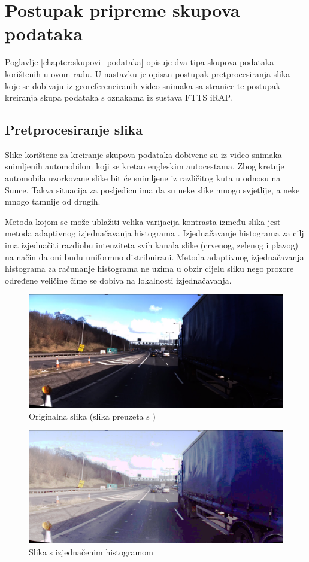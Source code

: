\documentclass[times, utf8, diplomski, numeric]{fer}
\begin{document}
\section{Postupak pripreme skupova podataka}
Poglavlje \ref{chapter:skupovi_podataka} opisuje dva tipa skupova podataka korištenih u ovom radu.
U nastavku je opisan postupak pretprocesiranja slika koje se dobivaju iz georeferenciranih video snimaka sa stranice \citep{url:ftts_irap} te postupak kreiranja skupa podataka s oznakama iz sustava FTTS iRAP.

\subsection{Pretprocesiranje slika}
Slike korištene za kreiranje skupova podataka dobivene su iz video snimaka snimljenih automobilom koji se kretao engleskim autocestama.
Zbog kretnje automobila uzorkovane slike bit će snimljene iz različitog kuta u odnosu na Sunce.
Takva situacija za posljedicu ima da su neke slike mnogo svjetlije, a neke mnogo tamnije od drugih.

Metoda kojom se može ublažiti velika varijacija kontrasta između slika jest metoda adaptivnog izjednačavanja histograma \citep{article:adapt_hist}.
Izjednačavanje histograma za cilj ima izjednačiti razdiobu intenziteta svih kanala slike (crvenog, zelenog i plavog) na način da oni budu uniformno distribuirani.
Metoda adaptivnog izjednačavanja histograma za računanje histograma ne uzima u obzir cijelu sliku nego prozore određene veličine čime se dobiva na lokalnosti izjednačavanja.

\begin{figure}[H]
\centering
\includegraphics[scale=0.2]{images/original.png}
\caption{Originalna slika (slika preuzeta s \citep{url:ftts_irap})}
\label{img:original}
\end{figure}

\begin{figure}[H]
\centering
\includegraphics[scale=0.2]{images/hist.png}
\caption{Slika s izjednačenim histogramom}
\label{img:hist}
\end{figure}
\end{document}
